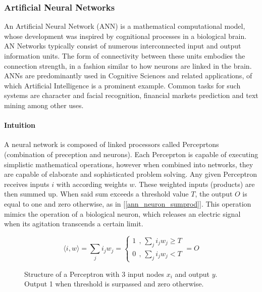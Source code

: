 \subsubsection{Artificial Neural Networks}
	An Artificial Neural Network (ANN) \cite{mcculloch1943logical} is a mathematical computational model, whose development was inspired by cognitional processes in a biological brain. AN Networks typically consist of numerous interconnected input and output information units. The form of connectivity between these units embodies the connection strength, in a fashion similar to how neurons are linked in the brain. ANNs are predominantly used in Cognitive Sciences and related applications, of which Artificial Intelligence is a prominent example. Common tasks for such systems are character and facial recognition, financial markets prediction and text mining among other uses.
	
	\paragraph{Intuition}
		A neural network is composed of linked processors called Perceprtons (combination of preception and neurons). Each Perceprton is capable of executing simplistic mathematical operations, however when combined into networks, they are capable of elaborate and sophisticated problem solving. Any given Perceptron receives inputs $ i $ with according weights $ w $. These weighted inputs (products) are then summed up. When said sum exceeds a threshold value $ T $, the output $ O $ is equal to one and zero otherwise, as in [\ref{ann_neuron_sumprod}]. This operation mimics the operation of a biological neuron, which releases an electric signal when its agitation transcends a certain limit.
	
	\begin{equation}
		\langle i,w \rangle = \sum_j i_j w_j = 
			\begin{cases}
				1 \ \ \text{,  } \sum_j i_j w_j \geq T \\
				0 \ \ \text{,  } \sum_j i_j w_j < T 
			\end{cases}
		 = O
		\label{ann_neuron_sumprod}
	\end{equation}
	
	\begin{figure}[h]
		\centering
		\captionsetup{width=0.8\textwidth}
		
		\caption[ANN Perceptron]{
			\footnotesize{
				Structure of a Perceptron with 3 input nodes $ x_i $ and output $ y $. Output 1 when threshold is surpassed and zero otherwise.
			}
		} 
		\label{ANN_percept}
	\end{figure}
	
